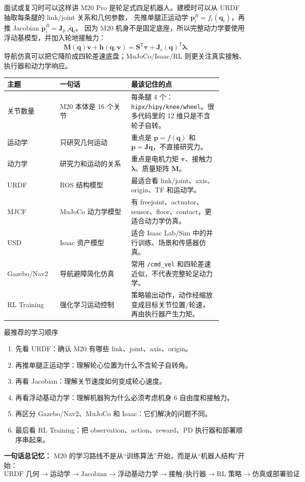\documentclass[UTF8,11pt,a4paper]{ctexart}
\newcommand{\T}{^{\mathsf T}}
\newcommand{\bs}[1]{\bm{#1}}
\begin{document}
\begin{orangebox}{面试或复习时可以这样讲}
M20 Pro 是轮足式四足机器人。建模时可以从 URDF 抽取每条腿的 link/joint 关系和几何参数，
先推单腿正运动学 \(\bs p_i^B=f_i(\bs q_i)\)，再推 Jacobian
\(\dot{\bs p}_i^B=\bs J_{p,i}\dot{\bs q}_i\)。
因为 M20 机身不是固定底座，所以完整动力学要使用浮动基模型，并加入轮地接触力：
\[
\bs M(\bs q)\dot{\bs v}+\bs h(\bs q,\bs v)
=
\bs S\T\bs\tau+\bs J_c(\bs q)\T\bs\lambda.
\]
导航仿真可以把它降阶成四轮差速底盘；MuJoCo/Isaac/RL 则更关注真实接触、执行器和动力学响应。
\end{orangebox}

\begin{center}
\renewcommand{\arraystretch}{1.3}
\begin{tabular}{p{0.22\linewidth}p{0.30\linewidth}p{0.36\linewidth}}
\toprule
\textbf{主题} & \textbf{一句话} & \textbf{最该记住的点}\\
\midrule
关节数量 & M20 本体是 16 个关节 & 每条腿 4 个：\texttt{hipx/hipy/knee/wheel}。很多代码里的 12 维只是不含轮子自转。\\
运动学 & 只研究几何运动 & 重点是 \(\bs p=f(\bs q)\) 和 \(\dot{\bs p}=\bs J\dot{\bs q}\)，不直接研究力。\\
动力学 & 研究力和运动的关系 & 重点是电机力矩 \(\bs\tau\)、接触力 \(\bs\lambda\)、质量矩阵 \(\bs M\)。\\
URDF & ROS 结构模型 & 最适合看 link/joint、axis、origin、TF 和运动学。\\
MJCF & MuJoCo 动力学模型 & 有 freejoint、actuator、sensor、floor、contact，更适合动力学仿真。\\
USD & Isaac 资产模型 & 适合 Isaac Lab/Sim 中的并行训练、场景和传感器仿真。\\
Gazebo/Nav2 & 导航避障简化仿真 & 常用 \texttt{/cmd\_vel} 和四轮差速近似，不代表完整轮足动力学。\\
RL Training & 强化学习运动控制 & 策略输出动作，动作经缩放变成目标关节位置/轮速，再由执行器产生力矩。\\
\bottomrule
\end{tabular}
\end{center}

\begin{greenbox}{最推荐的学习顺序}
\begin{enumerate}
  \item 先看 URDF：确认 M20 有哪些 link、joint、axis、origin。
  \item 再推单腿正运动学：理解轮心位置为什么不含轮子自转角。
  \item 再看 Jacobian：理解关节速度如何变成轮心速度。
  \item 再看浮动基动力学：理解机器狗为什么必须考虑机身 6 自由度和接触力。
  \item 再区分 Gazebo/Nav2、MuJoCo 和 Isaac：它们解决的问题不同。
  \item 最后看 RL Training：把 observation、action、reward、PD 执行器和部署顺序串起来。
\end{enumerate}
\end{greenbox}

\begin{answerbox}
\textbf{一句话总记忆：}
M20 的学习路线不是从“训练算法”开始，而是从“机器人结构”开始：
\[
\text{URDF 几何}
\rightarrow
\text{运动学}
\rightarrow
\text{Jacobian}
\rightarrow
\text{浮动基动力学}
\rightarrow
\text{接触/执行器}
\rightarrow
\text{RL 策略}
\rightarrow
\text{仿真或部署验证}.
\]
\end{answerbox}
\end{document}

